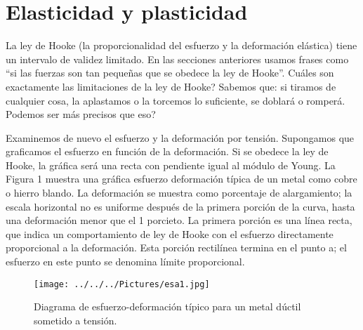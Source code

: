 \documentclass[11pt,a4paper]{article}
\begin{document}
\section*{Elasticidad y plasticidad}
La ley de Hooke (la proporcionalidad del esfuerzo y la deformaci\'{o}n el\'{a}stica) tiene un intervalo de validez limitado. En las secciones anteriores usamos frases como “si las fuerzas son tan peque\~{n}as que se obedece la ley de Hooke”. Cu\'{a}les son exactamente las limitaciones de la ley de Hooke? Sabemos que: si tiramos de cualquier cosa, la aplastamos o la torcemos lo suficiente, se doblar\'{a} o romper\'{a}. Podemos ser m\'{a}s precisos que eso?

Examinemos de nuevo el esfuerzo y la deformaci\'{o}n por tensi\'{o}n. Supongamos que graficamos el esfuerzo en funci\'{o}n de la deformaci\'{o}n. Si se obedece la ley de Hooke, la gr\'{a}fica ser\'{a} una recta con pendiente igual al m\'{o}dulo de Young. La Figura 1 muestra una gr\'{a}fica esfuerzo deformaci\'{o}n t\'{i}pica de un metal como cobre o hierro blando. La deformaci\'{o}n se muestra como porcentaje de alargamiento; la escala horizontal no es uniforme despu\'{e}s de la primera porci\'{o}n de la curva, hasta una deformaci\'{o}n menor que el 1 porcieto. La primera porci\'{o}n es una l\'{i}nea recta, que indica un comportamiento de ley de Hooke con el esfuerzo directamente proporcional a la deformaci\'{o}n. Esta porci\'{o}n rectil\'{i}nea termina en el punto a; el esfuerzo en este punto se denomina l\'{i}mite proporcional.
\\
\begin{figure}[hbtp]
\centering
\texttt{[image: ../../../Pictures/esa1.jpg]}
\caption{ Diagrama de esfuerzo-deformaci\'{o}n t\'{i}pico para un metal d\'{u}ctil sometido a tensi\'{o}n.}
\end{figure}
\\
\end{document}

